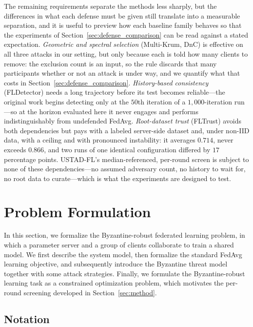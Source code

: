 \documentclass[journal]{IEEEtran}
\begin{document}
The remaining requirements separate the methods less sharply, but the differences in what each defense must be given still translate into a measurable separation, and it is useful to preview how each baseline family behaves so that the experiments of Section~\ref{sec:defense_comparison} can be read against a stated expectation. \emph{Geometric and spectral selection} (Multi-Krum, DnC) is effective on all three attacks in our setting, but only because each is told how many clients to remove: the exclusion count is an input, so the rule discards that many participants whether or not an attack is under way, and we quantify what that costs in Section~\ref{sec:defense_comparison}. \emph{History-based consistency} (FLDetector) needs a long trajectory before its test becomes reliable---the original work begins detecting only at the $50$th iteration of a $1{,}000$-iteration run---so at the horizon evaluated here it never engages and performs indistinguishably from undefended FedAvg. \emph{Root-dataset trust} (FLTrust) avoids both dependencies but pays with a labeled server-side dataset and, under non-IID data, with a ceiling and with pronounced instability: it averages $0.714$, never exceeds $0.866$, and two runs of one identical configuration differed by $17$ percentage points. USTAD-FL's median-referenced, per-round screen is subject to none of these dependencies---no assumed adversary count, no history to wait for, no root data to curate---which is what the experiments are designed to test.

\section{Problem Formulation}
\label{sec:formulation}

In this section, we formalize the Byzantine-robust federated learning problem, in which a parameter server and a group of clients collaborate to train a shared model. We first describe the system model, then formalize the standard FedAvg learning objective, and subsequently introduce the Byzantine threat model together with some attack strategies. Finally, we formulate the Byzantine-robust learning task as a constrained optimization problem, which motivates the per-round screening developed in Section~\ref{sec:method}.

\subsection{Notation}
\end{document}

